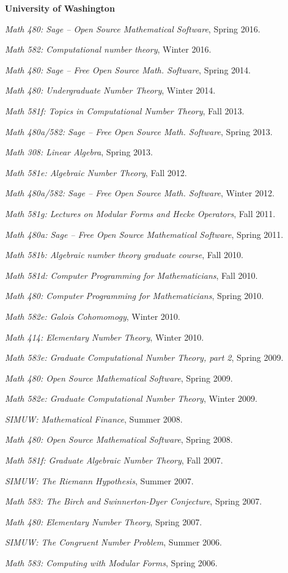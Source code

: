 \documentclass[10pt]{article}
\newcounter{totalnumclasses}
\newenvironment{classes}
   {
   \begin{revnumerate}[\value{totalnumclasses}]
   {}
         {
            \setlength{\itemsep}{.5ex}
            \setlength{\parsep}{0ex}
            \setlength{\leftmargin}{0em}
            \setlength{\parskip}{0ex}
            \setlength{\topsep}{0ex}
         }
   }
   {
\end{revnumerate}
   }
\newcommand{\marginlabel}[1]{
\begin{minipage}[b]{0.8\labelwidth}{\large \textsf{\textbf{#1}}}\end{minipage}}
\newcommand{\entrylabel}[1]{\mbox{\marginlabel{#1}}\hfill}
\newcommand{\MainListlabel}[1]
   {
      \parbox[t]{\labelwidth}{\hspace{.8em}\marginlabel{#1}}
   }
\newenvironment{MainList}[1]
   {
      \renewcommand{\entrylabel}{\MainListlabel}
      \begin{list}{}
      {
         \renewcommand{\makelabel}{\entrylabel}
         \setlength   {\itemindent}{-.65em}
         \setlength   {\labelwidth}{#1}
         \setlength   {\leftmargin}{\labelwidth}
         \setlength   {\itemsep}{3ex}
      }
   }
   {
      \end{list}
   }
\begin{document}
\begin{MainList}{88pt}
{\bf University of Washington}
\setcounter{totalnumclasses}{40}
\begin{classes}
\item {\em Math 480: Sage -- Open Source Mathematical Software}, Spring 2016.
\item {\em Math 582: Computational number theory}, Winter 2016.
\item {\em Math 480: Sage -- Free Open Source Math. Software}, Spring 2014.
\item {\em Math 480: Undergraduate Number Theory}, Winter 2014.
\item {\em Math 581f: Topics in Computational Number Theory}, Fall 2013.
\item {\em Math 480a/582: Sage -- Free Open Source Math. Software}, Spring 2013.
\item {\em Math 308: Linear Algebra}, Spring 2013.
\item {\em Math 581e: Algebraic Number Theory}, Fall 2012.
\item {\em Math 480a/582: Sage -- Free Open Source Math. Software}, Winter 2012.
\item {\em Math 581g: Lectures on Modular Forms and Hecke Operators}, Fall 2011.
\item {\em Math 480a: Sage -- Free Open Source Mathematical Software}, Spring 2011.
\item {\em Math 581b: Algebraic number theory graduate course}, Fall 2010.
\item {\em Math 581d: Computer Programming for Mathematicians}, Fall 2010.
\item {\em Math 480: Computer Programming for Mathematicians}, Spring 2010.
\item {\em Math 582e: Galois Cohomomogy}, Winter 2010.
\item {\em Math 414: Elementary Number Theory}, Winter 2010.
\item {\em Math 583e: Graduate Computational Number Theory, part 2}, Spring 2009.
\item {\em Math 480: Open Source Mathematical Software},  Spring 2009.
\item {\em Math 582e: Graduate Computational Number Theory}, Winter 2009.
\item {\em SIMUW: Mathematical Finance}, Summer 2008.
\item {\em Math 480: Open Source Mathematical Software},  Spring 2008.
\item {\em Math 581f: Graduate Algebraic Number Theory}, Fall 2007.
\item {\em SIMUW: The Riemann Hypothesis}, Summer 2007.
\item {\em Math 583: The Birch and Swinnerton-Dyer Conjecture}, Spring 2007.
\item {\em Math 480: Elementary Number Theory},  Spring 2007.
\item {\em SIMUW: The Congruent Number Problem}, Summer 2006.
\item {\em Math 583: Computing with Modular Forms},  Spring 2006.
\end{classes}



\end{MainList}
\end{document}
